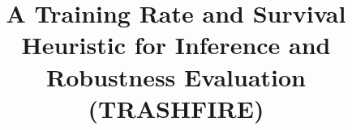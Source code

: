 \documentclass[conference]{IEEEtran}
\begin{document}
\title{A Training Rate and Survival Heuristic for Inference and Robustness Evaluation (TRASHFIRE)}
\author[1]{ }

\maketitle







\printbibliography
\end{document}
